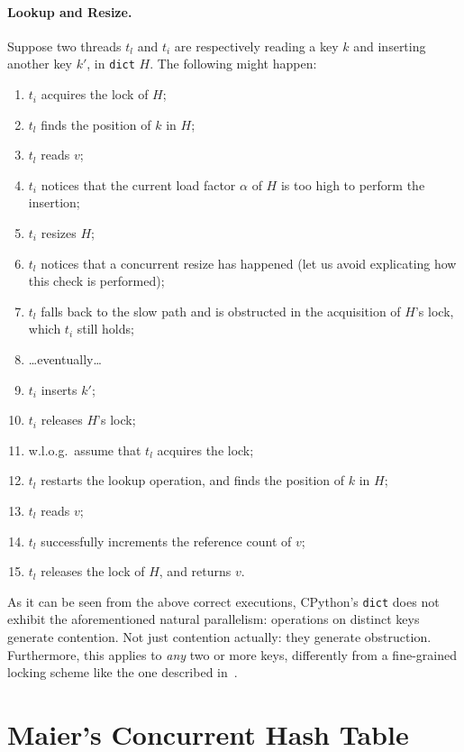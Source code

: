 \paragraph{Lookup and Resize.}
Suppose two threads $t_l$ and $t_i$ are respectively reading a key $k$ and inserting another key $k'$, in \texttt{dict} $H$.
The following might happen:
\begin{enumerate}
	\item $t_i$ acquires the lock of $H$;
	\item $t_l$ finds the position of $k$ in $H$;
	\item $t_l$ reads $v$;
	\item $t_i$ notices that the current load factor $\alpha$ of $H$ is too high to perform the insertion;
	\item $t_i$ resizes $H$;
	\item $t_l$ notices that a concurrent resize has happened (let us avoid explicating how this check is performed);
	\item $t_l$ falls back to the slow path and is obstructed in the acquisition of $H$'s lock, which $t_i$ still holds;
	\item {\ldots}eventually{\ldots}
	\item $t_i$ inserts $k'$;
	\item $t_i$ releases $H$'s lock;
	\item w.l.o.g.\ assume that $t_l$ acquires the lock;
	\item $t_l$ restarts the lookup operation, and finds the position of $k$ in $H$;
	\item $t_l$ reads $v$;
	\item $t_l$ successfully increments the reference count of $v$;
	\item $t_l$ releases the lock of $H$, and returns $v$.
\end{enumerate}

As it can be seen from the above correct executions, CPython's \texttt{dict} does not exhibit the aforementioned natural parallelism: operations on distinct keys generate contention.
Not just contention actually: they generate obstruction.
Furthermore, this applies to \emph{any} two or more keys, differently from a fine-grained locking scheme like the one described in~\cite[\S13.2.2]{art-mp}.


\section{Maier's Concurrent Hash Table}\label{sec:maier-review}

